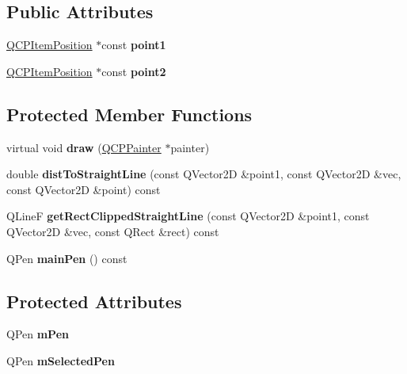 \subsection*{Public Attributes}
\begin{DoxyCompactItemize}
\item 
\hypertarget{class_q_c_p_item_straight_line_ac131a6ffe456f2cc7364dce541fe0120}{}\label{class_q_c_p_item_straight_line_ac131a6ffe456f2cc7364dce541fe0120} 
\hyperlink{class_q_c_p_item_position}{Q\+C\+P\+Item\+Position} $\ast$const {\bfseries point1}
\item 
\hypertarget{class_q_c_p_item_straight_line_ad26c0a732e471f63f75d481dcd48cfc9}{}\label{class_q_c_p_item_straight_line_ad26c0a732e471f63f75d481dcd48cfc9} 
\hyperlink{class_q_c_p_item_position}{Q\+C\+P\+Item\+Position} $\ast$const {\bfseries point2}
\end{DoxyCompactItemize}
\subsection*{Protected Member Functions}
\begin{DoxyCompactItemize}
\item 
\hypertarget{class_q_c_p_item_straight_line_a2daa1e1253216c26565d56a2d5530170}{}\label{class_q_c_p_item_straight_line_a2daa1e1253216c26565d56a2d5530170} 
virtual void {\bfseries draw} (\hyperlink{class_q_c_p_painter}{Q\+C\+P\+Painter} $\ast$painter)
\item 
\hypertarget{class_q_c_p_item_straight_line_a17107170ed03722e6d626a3ff5a8491c}{}\label{class_q_c_p_item_straight_line_a17107170ed03722e6d626a3ff5a8491c} 
double {\bfseries dist\+To\+Straight\+Line} (const Q\+Vector2D \&point1, const Q\+Vector2D \&vec, const Q\+Vector2D \&point) const
\item 
\hypertarget{class_q_c_p_item_straight_line_af0c893b7196ba210555a8f4332707eab}{}\label{class_q_c_p_item_straight_line_af0c893b7196ba210555a8f4332707eab} 
Q\+LineF {\bfseries get\+Rect\+Clipped\+Straight\+Line} (const Q\+Vector2D \&point1, const Q\+Vector2D \&vec, const Q\+Rect \&rect) const
\item 
\hypertarget{class_q_c_p_item_straight_line_a5b1a39cfc54c3e22f65de2958d40eb59}{}\label{class_q_c_p_item_straight_line_a5b1a39cfc54c3e22f65de2958d40eb59} 
Q\+Pen {\bfseries main\+Pen} () const
\end{DoxyCompactItemize}
\subsection*{Protected Attributes}
\begin{DoxyCompactItemize}
\item 
\hypertarget{class_q_c_p_item_straight_line_a15106ddc2ebd73ed5c1bc57aa92bee8f}{}\label{class_q_c_p_item_straight_line_a15106ddc2ebd73ed5c1bc57aa92bee8f} 
Q\+Pen {\bfseries m\+Pen}
\item 
\hypertarget{class_q_c_p_item_straight_line_a0307a0d56a018656adbf798bc84c2a4b}{}\label{class_q_c_p_item_straight_line_a0307a0d56a018656adbf798bc84c2a4b} 
Q\+Pen {\bfseries m\+Selected\+Pen}
\end{DoxyCompactItemize}
